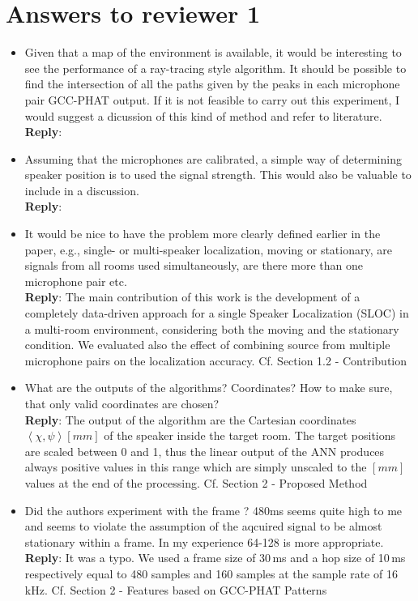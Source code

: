 \documentclass[11pt, technote, letterpaper, oneside, onecolumn]{IEEEtran}
\begin{document}
\section{Answers to reviewer 1}\label{sec:rev1}
\begin{itemize}
\item Given that a map of the environment is available, it would be interesting to see the performance of a ray-tracing style algorithm. It should be possible to find the intersection of all the paths given by the peaks in each microphone pair GCC-PHAT output. If it is not feasible to carry out this experiment, I would suggest a dicussion of this kind of method and refer to literature.\\
\textbf{Reply}:

\item Assuming that the microphones are calibrated, a simple way of determining speaker position is to used the signal strength. This would also be valuable to include in a discussion.\\
\textbf{Reply}:

\item It would be nice to have the problem more clearly defined earlier in the paper, e.g., single- or multi-speaker localization, moving or stationary, are signals from all rooms used simultaneously, are there more than one microphone pair etc.\\
\textbf{Reply}: The main contribution of this work is the development of a completely data-driven approach for a single Speaker Localization (SLOC) in a multi-room environment, considering both the moving and the stationary condition. We evaluated also the effect of combining source from multiple microphone pairs on the localization accuracy. Cf. Section 1.2 - Contribution 

\item What are the outputs of the algorithms? Coordinates? How to make sure, that only valid coordinates are chosen?\\
\textbf{Reply}: The output of the algorithm are the Cartesian coordinates $\left \langle \chi,\psi \right \rangle \left [mm\right ]$ of the speaker inside the target room. The target positions are scaled between 0 and 1, thus the linear output of the ANN produces always positive values in this range which are simply unscaled to the $\left [mm\right ]$ values at the end of the processing. Cf. Section 2 - Proposed Method

\item Did the authors experiment with the frame ? 480ms seems quite high to me and seems to violate the assumption of the aqcuired signal to be almost stationary within a frame. In my experience 64-128 is more appropriate.\\
\textbf{Reply}: It was a typo. We used a frame size of 30\,ms and a hop size of 10\,ms respectively equal to 480 samples and 160 samples at the sample rate of 16\,kHz. Cf. Section 2 - Features based on GCC-PHAT Patterns


\end{itemize}
\end{document}
